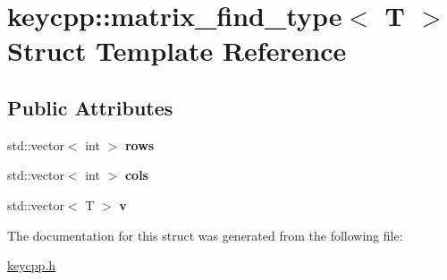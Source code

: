 \hypertarget{structkeycpp_1_1matrix__find__type}{\section{keycpp\-:\-:matrix\-\_\-find\-\_\-type$<$ T $>$ Struct Template Reference}
\label{structkeycpp_1_1matrix__find__type}
}
\subsection*{Public Attributes}
\begin{DoxyCompactItemize}
\item 
\hypertarget{structkeycpp_1_1matrix__find__type_a34ca318ae96bc18fe29ac2a42ab1b520}{std\-::vector$<$ int $>$ {\bfseries rows}}\label{structkeycpp_1_1matrix__find__type_a34ca318ae96bc18fe29ac2a42ab1b520}

\item 
\hypertarget{structkeycpp_1_1matrix__find__type_a034a9a0159b07d68cdc688e36648667c}{std\-::vector$<$ int $>$ {\bfseries cols}}\label{structkeycpp_1_1matrix__find__type_a034a9a0159b07d68cdc688e36648667c}

\item 
\hypertarget{structkeycpp_1_1matrix__find__type_a46d32e3990c9333dbbfc77adece4159b}{std\-::vector$<$ T $>$ {\bfseries v}}\label{structkeycpp_1_1matrix__find__type_a46d32e3990c9333dbbfc77adece4159b}

\end{DoxyCompactItemize}


The documentation for this struct was generated from the following file\-:\begin{DoxyCompactItemize}
\item 
\hyperlink{keycpp_8h}{keycpp.\-h}\end{DoxyCompactItemize}
